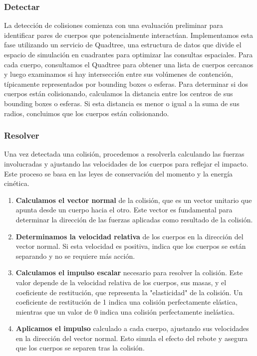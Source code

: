 \subsubsection{Detectar}
La detección de colisiones comienza con una evaluación preliminar para identificar pares de cuerpos que potencialmente interactúan. Implementamos esta fase utilizando un servicio de Quadtree, una estructura de datos que divide el espacio de simulación en cuadrantes para optimizar las consultas espaciales. Para cada cuerpo, consultamos el Quadtree para obtener una lista de cuerpos cercanos y luego examinamos si hay intersección entre sus volúmenes de contención, típicamente representados por bounding boxes o esferas.
Para determinar si dos cuerpos están colisionando, calculamos la distancia entre los centros de sus bounding boxes o esferas. Si esta distancia es menor o igual a la suma de sus radios, concluimos que los cuerpos están colisionando.
\subsubsection{Resolver}
Una vez detectada una colisión, procedemos a resolverla calculando las fuerzas involucradas y ajustando las velocidades de los cuerpos para reflejar el impacto. Este proceso se basa en las leyes de conservación del momento y la energía cinética.
\begin{enumerate}
    \item \textbf{Calculamos el vector normal} de la colisión, que es un vector unitario que apunta desde un cuerpo hacia el otro. Este vector es fundamental para determinar la dirección de las fuerzas aplicadas como resultado de la colisión.
    \item \textbf{Determinamos la velocidad relativa} de los cuerpos en la dirección del vector normal. Si esta velocidad es positiva, indica que los cuerpos se están separando y no se requiere más acción.
    \item \textbf{Calculamos el impulso escalar} necesario para resolver la colisión. Este valor depende de la velocidad relativa de los cuerpos, sus masas, y el coeficiente de restitución, que representa la "elasticidad" de la colisión. Un coeficiente de restitución de 1 indica una colisión perfectamente elástica, mientras que un valor de 0 indica una colisión perfectamente inelástica.
    \item \textbf{Aplicamos el impulso} calculado a cada cuerpo, ajustando sus velocidades en la dirección del vector normal. Esto simula el efecto del rebote y asegura que los cuerpos se separen tras la colisión.
\end{enumerate}
